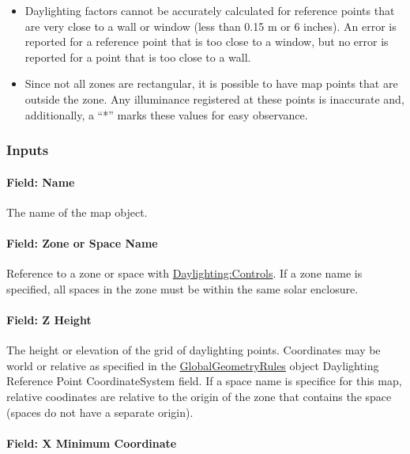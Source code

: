 \begin{itemize}
\item Daylighting factors cannot be accurately calculated for reference points that are very close to a wall or window (less than 0.15 m or 6 inches). An error is reported for a reference point that is too close to a window, but no error is reported for a point that is too close to a wall.
\item Since not all zones are rectangular, it is possible to have map points that are outside the zone. Any illuminance registered at these points is inaccurate and, additionally, a ``*'' marks these values for easy observance.
\end{itemize}

\subsubsection{Inputs}\label{inputs-4-006}

\paragraph{Field: Name}\label{field-name-2-007}

The name of the map object.

\paragraph{Field: Zone or Space Name}\label{field-zone-name-2-000}

Reference to a zone or space with \hyperref[daylightingcontrols-000]{Daylighting:Controls}. If a zone name is specified, all spaces in the zone must be within the same solar enclosure.

\paragraph{Field: Z Height}\label{field-z-height}

The height or elevation of the grid of daylighting points.  Coordinates may be world or relative as specified in the \hyperref[globalgeometryrules]{GlobalGeometryRules} object Daylighting Reference Point CoordinateSystem field. If a space name is specifice for this map, relative coodinates are relative to the origin of the zone that contains the space  (spaces do not have a separate origin).

\paragraph{Field: X Minimum Coordinate}\label{field-x-minimum-coordinate}

